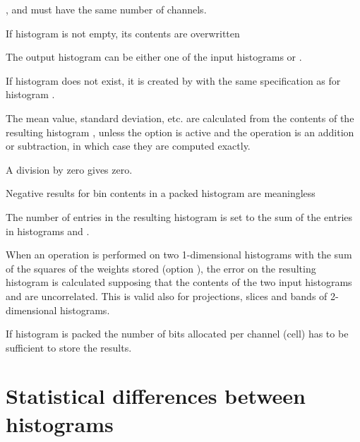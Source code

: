 \Remark
\begin{UL}
\item {},  and 
      must have the same number of channels.
\item If histogram  is not empty, its contents are overwritten
\item The output histogram  can be either one of the input 
      histograms  or .
\item If histogram  does not exist, it is created
      by  with the same specification as for histogram .
\item The mean value, standard deviation, etc. are calculated from the
      contents of the resulting histogram ,
      unless the  option is active and the
      operation is an addition or subtraction, in which case
      they are computed exactly.
\item A division by zero gives zero.
\item Negative results for bin contents in a packed histogram are
      meaningless
\item The number of entries in the resulting histogram  is set
      to the sum of the entries in histograms  and .
\item When an operation is performed on two 1-dimensional histograms with
      the sum of the squares of the weights stored (option ), the
      error on the resulting histogram is calculated
      supposing that the contents of the two input histograms  and
       are uncorrelated.
      This is valid also for projections, slices and
      bands of 2-dimensional histograms.
\item If histogram  is packed the
      number of bits allocated per channel (cell) has to be sufficient
      to store the results.
\end{UL}
 
\newpage%

\section{Statistical differences between histograms}
\label{HSTATDIF}

 
